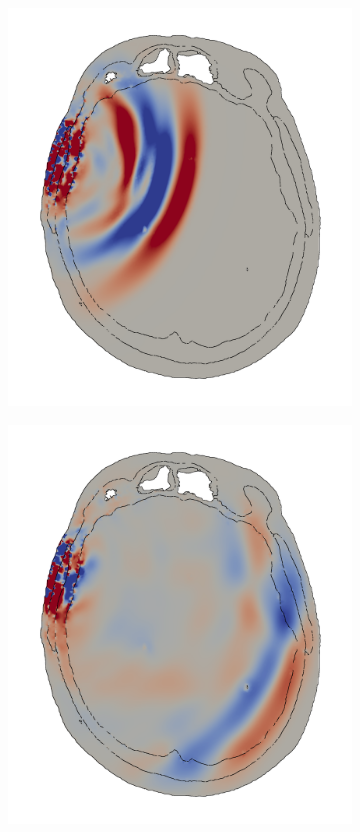 \documentclass[a4paper]{article}
\numberwithin{equation}{section}
\begin{document}
\begin{figure}[h]
\begin{subfigure}{.18\textwidth}
  \includegraphics[width=1.0\linewidth]{pictures/skull/elastic-pressure-z-with-bounds/six/2.png}
\end{subfigure}
\begin{subfigure}{.18\textwidth}
  \centering
  \includegraphics[width=1.0\linewidth]{pictures/skull/elastic-pressure-z-with-bounds/six/3.png}

\end{subfigure}
\end{figure}
\end{document}
